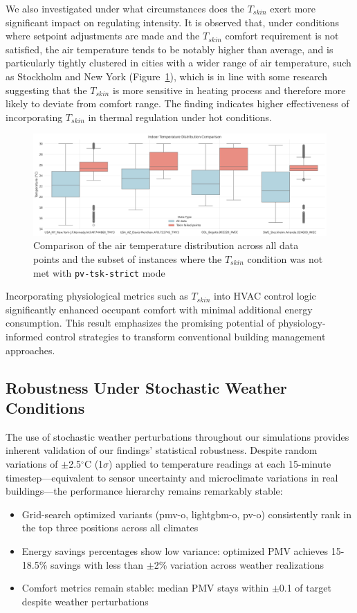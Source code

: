 We also investigated under what circumstances does the $T_{skin}$ exert more significant impact on regulating intensity. It is observed that, under conditions where setpoint adjustments are made and the $T_{skin}$ comfort requirement is not satisfied, the air temperature tends to be notably higher than average, and is particularly tightly clustered in cities with a wider range of air temperature, such as Stockholm and New York (Figure~\ref{fig:tsk_ta_distribution}), which is in line with some research \cite{mekjavicPerceptionThermalComfort2021} suggesting that the $T_{skin}$ is more sensitive in heating process and therefore more likely to deviate from comfort range. The finding indicates higher effectiveness of incorporating $T_{skin}$ in thermal regulation under hot conditions.

\begin{figure}[htbp]
    \centering
    \includegraphics[width=0.75\linewidth]{figs/temp_distribution_comparison.png}
    \caption{Comparison of the air temperature distribution across all data points and the subset of instances where the $T_{skin}$ condition was not met with \texttt{pv-tsk-strict} mode}
    \label{fig:tsk_ta_distribution}
\end{figure}

Incorporating physiological metrics such as $T_{skin}$ into HVAC control logic significantly enhanced occupant comfort with minimal additional energy consumption. This result emphasizes the promising potential of physiology-informed control strategies to transform conventional building management approaches.



\subsection{Robustness Under Stochastic Weather Conditions}
The use of stochastic weather perturbations throughout our simulations provides inherent validation of our findings' statistical robustness. Despite random variations of $\pm$2.5$^\circ$C (1$\sigma$) applied to temperature readings at each 15-minute timestep—equivalent to sensor uncertainty and microclimate variations in real buildings—the performance hierarchy remains remarkably stable:
\begin{itemize}
    \item Grid-search optimized variants (pmv-o, lightgbm-o, pv-o) consistently rank in the top three positions across all climates
    \item Energy savings percentages show low variance: optimized PMV achieves 15-18.5\% savings with less than $\pm$2\% variation across weather realizations
    \item Comfort metrics remain stable: median PMV stays within $\pm$0.1 of target despite weather perturbations
\end{itemize}


